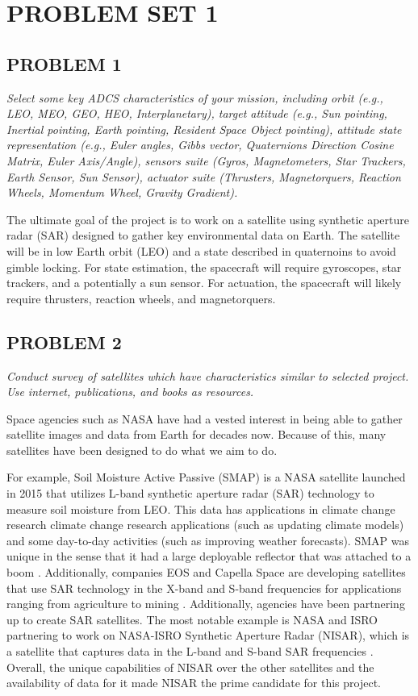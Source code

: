 \section{\Large PROBLEM SET 1}
\subsection{PROBLEM 1}
\textit{Select some key ADCS characteristics of your mission, including orbit (e.g., LEO, MEO, GEO, HEO, Interplanetary), target attitude (e.g., Sun pointing, Inertial pointing, Earth pointing, Resident Space Object pointing), attitude state representation (e.g., Euler angles, Gibbs vector, Quaternions Direction Cosine Matrix, Euler Axis/Angle), sensors suite (Gyros, Magnetometers, Star Trackers, Earth Sensor, Sun Sensor), actuator suite (Thrusters, Magnetorquers, Reaction Wheels, Momentum Wheel, Gravity Gradient).}

The ultimate goal of the project is to work on a satellite using synthetic aperture radar (SAR) designed to gather key environmental data on Earth. The satellite will be in low Earth orbit (LEO) and a state described in quaternoins to avoid gimble locking. For state estimation, the spacecraft will require gyroscopes, star trackers, and a potentially a sun sensor. For actuation, the spacecraft will likely require thrusters, reaction wheels, and magnetorquers.

\subsection{PROBLEM 2}
\textit{Conduct survey of satellites which have characteristics similar to selected project. Use internet, publications, and books as resources.}

Space agencies such as NASA have had a vested interest in being able to gather satellite images and data from Earth for decades now. Because of this, many satellites have been designed to do what we aim to do.

For example, Soil Moisture Active Passive (SMAP) is a NASA satellite launched in 2015 that utilizes L-band synthetic aperture radar (SAR) technology to measure soil moisture from LEO. This data has applications in climate change research climate change research applications (such as updating climate models) and some day-to-day activities (such as improving weather forecasts). SMAP was unique in the sense that it had a large deployable reflector that was attached to a boom \cite{SMAP}. Additionally, companies EOS and Capella Space are developing satellites that use SAR technology in the X-band and S-band frequencies for applications ranging from agriculture to mining \cite{EOSSAR, Capella}. Additionally, agencies have been partnering up to create SAR satellites. The most notable example is NASA and ISRO partnering to work on NASA-ISRO Synthetic Aperture Radar (NISAR), which is a satellite that captures data in the L-band and S-band SAR frequencies \cite{NISARMission}. Overall, the unique capabilities of NISAR over the other satellites and the availability of data for it made NISAR the prime candidate for this project.

